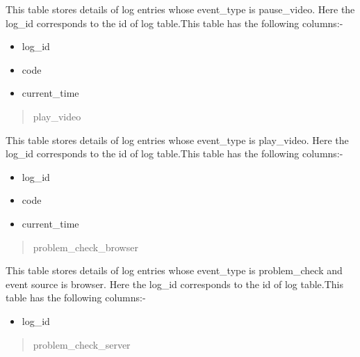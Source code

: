 \documentclass[a4paper,12pt,oneside]{sphinxmanual}
\begin{document}
\begin{DUlineblock}{0em}
\item[] This table stores details of log entries whose event\_type is pause\_video.  Here the log\_id                 corresponds  to the id of log table.This table has the following columns:-
\end{DUlineblock}
\begin{itemize}
\item {} 
log\_id

\item {} 
code

\item {} 
current\_time

\end{itemize}
\begin{quote}\begin{description}
\item[{play\_video}] \leavevmode
\end{description}\end{quote}

\begin{DUlineblock}{0em}
\item[] This table stores details of log entries whose event\_type is play\_video.  Here the log\_id                 corresponds  to the id of log table.This table has the following columns:-
\end{DUlineblock}
\begin{itemize}
\item {} 
log\_id

\item {} 
code

\item {} 
current\_time

\end{itemize}
\begin{quote}\begin{description}
\item[{problem\_check\_browser}] \leavevmode
\end{description}\end{quote}

\begin{DUlineblock}{0em}
\item[] This table stores details of log entries whose event\_type is problem\_check and event source is browser.  Here the log\_id    corresponds  to the id of log table.This table has the following columns:-
\end{DUlineblock}
\begin{itemize}
\item {} 
log\_id

\end{itemize}
\begin{quote}\begin{description}
\item[{problem\_check\_server}] \leavevmode
\end{description}\end{quote}
\end{document}
